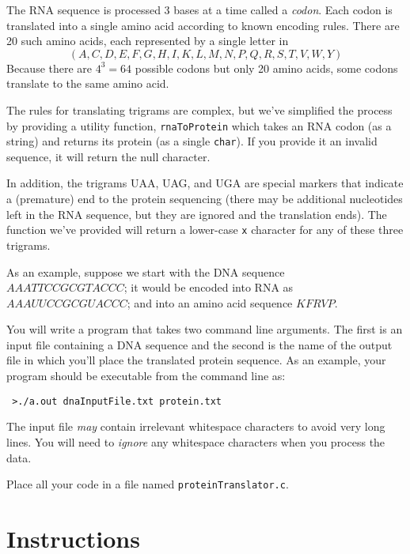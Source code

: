 \documentclass[12pt]{scrartcl}
\begin{document}
The RNA sequence is processed 3 bases at a time called a \emph{codon}.  
Each codon is translated into a single amino acid according to known 
encoding rules.  There are 20 such amino acids, each represented by a 
single letter in 
 $$(A,C,D,E,F,G,H,I,K,L,M,N,P,Q,R,S,T,V,W,Y)$$
Because there are $4^3 = 64$ possible codons but only 20 amino acids,
some codons translate to the same amino acid.

The rules for translating trigrams are complex, but we've simplified
the process by providing a utility function, \texttt{rnaToProtein}
which takes an RNA codon (as a string) and returns its protein (as a 
single \texttt{char}).  If you provide it an invalid sequence, it
will return \texttt{\0} the null character.

In addition, the trigrams UAA, UAG, and UGA are special markers that 
indicate a (premature) end to the protein sequencing (there may be 
additional nucleotides left in the RNA sequence, but they are ignored 
and the translation ends).  The function we've provided will
return a lower-case \texttt{x} character for any of these three 
trigrams.

As an example, suppose we start with the DNA sequence $AAATTCCGCGTACCC$; 
it would be encoded into RNA as $AAAUUCCGCGUACCC$; and into an amino 
acid sequence $KFRVP$.

You will write a program that takes two command line arguments.  The
first is an input file containing a DNA sequence and the second is the
name of the output file in which you'll place the translated protein
sequence.  As an example, your program should be executable from the 
command line as:

\texttt{~>./a.out dnaInputFile.txt protein.txt}

The input file \emph{may} contain irrelevant whitespace characters to
avoid very long lines.  You will need to \emph{ignore} any whitespace
characters when you process the data.  

Place all your code in a file named \texttt{proteinTranslator.c}.

\section*{Instructions}
\end{document}
